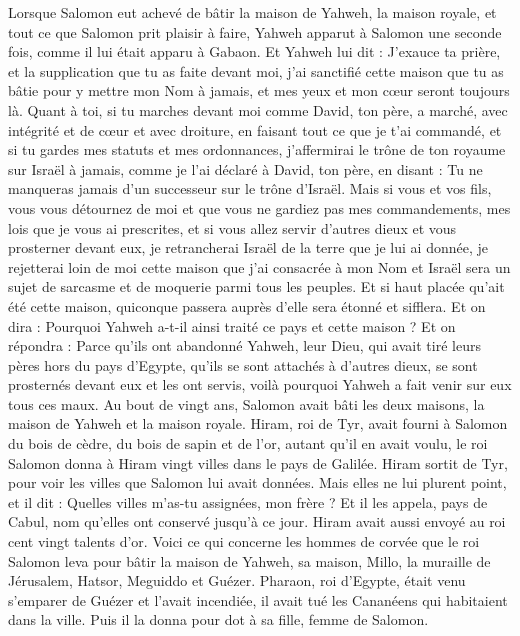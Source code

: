 \begin{multicols}{2}
\VerseOne{}Lorsque Salomon eut achevé de bâtir la maison de Yahweh, la maison royale, et tout ce que Salomon prit plaisir à faire,
Yahweh apparut à Salomon une seconde fois, comme il lui était apparu à Gabaon.
Et Yahweh lui dit : J'exauce ta prière, et la supplication que tu as faite devant moi, j'ai sanctifié cette maison que tu as bâtie pour y mettre mon Nom à jamais, et mes yeux et mon cœur seront toujours là.
Quant à toi, si tu marches devant moi comme David, ton père, a marché, avec intégrité et de cœur et avec droiture, en faisant tout ce que je t'ai commandé, et si tu gardes mes statuts et mes ordonnances,
j’affermirai le trône de ton royaume sur Israël à jamais, comme je l’ai déclaré à David, ton père, en disant : Tu ne manqueras jamais d’un successeur sur le trône d'Israël.
Mais si vous et vos fils, vous vous détournez de moi et que vous ne gardiez pas mes commandements, mes lois que je vous ai prescrites, et si vous allez servir d'autres dieux et vous prosterner devant eux,
je retrancherai Israël de la terre que je lui ai donnée, je rejetterai loin de moi cette maison que j'ai consacrée à mon Nom et Israël sera un sujet de sarcasme et de moquerie parmi tous les peuples.
Et si haut placée qu’ait été cette maison, quiconque passera auprès d'elle sera étonné et sifflera. Et on dira : Pourquoi Yahweh a-t-il ainsi traité ce pays et cette maison ?
Et on répondra : Parce qu'ils ont abandonné Yahweh, leur Dieu, qui avait tiré leurs pères hors du pays d'Egypte, qu'ils se sont attachés à d'autres dieux, se sont prosternés devant eux et les ont servis, voilà pourquoi Yahweh a fait venir sur eux tous ces maux.
Au bout de vingt ans, Salomon avait bâti les deux maisons, la maison de Yahweh et la maison royale.
Hiram, roi de Tyr, avait fourni à Salomon du bois de cèdre, du bois de sapin et de l'or, autant qu'il en avait voulu, le roi Salomon donna à Hiram vingt villes dans le pays de Galilée.
Hiram sortit de Tyr, pour voir les villes que Salomon lui avait données. Mais elles ne lui plurent point,
et il dit : Quelles villes m'as-tu assignées, mon frère ? Et il les appela, pays de Cabul, nom qu’elles ont conservé jusqu'à ce jour.
Hiram avait aussi envoyé au roi cent vingt talents d'or.
Voici ce qui concerne les hommes de corvée que le roi Salomon leva pour bâtir la maison de Yahweh, sa maison, Millo, la muraille de Jérusalem, Hatsor, Meguiddo et Guézer.
Pharaon, roi d'Egypte, était venu s’emparer de Guézer et l'avait incendiée, il avait tué les Cananéens qui habitaient dans la ville. Puis il la donna pour dot à sa fille, femme de Salomon.

\end{multicols}
